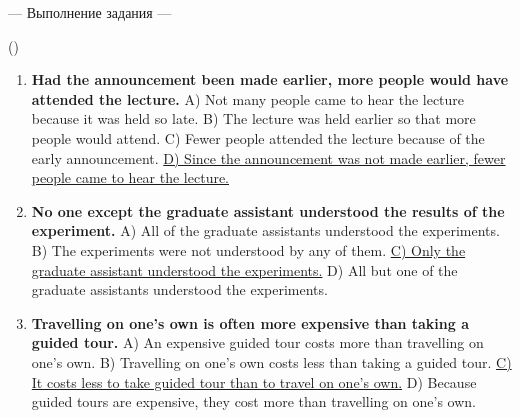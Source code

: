 \documentclass[main.tex]{subfiles}
\begin{document}


\newpage
{}

\newpage
{}

\hypertarget{ltask:2024-03-27}{--- Выполнение задания ---} (\hyperref[task:2024-03-27]{\color{blue}{перейти к тексту задания}})
\\

\vspace{5pt}
\begin{enumerate}[nosep, leftmargin=*]
	\itemsep15pt
	\item \textbf{Had the announcement been made earlier, more people would have attended the lecture.}\newline
		A) Not many people came to hear the lecture because it was held so late.\newline
		B) The lecture was held earlier so that more people would attend.\newline
		C) Fewer people attended the lecture because of the early announcement.\newline
		\uline{D) Since the announcement was not made earlier, fewer people came to hear the lecture.}
	\item \textbf{No one except the graduate assistant understood the results of the experiment.}\newline
		A) All of the graduate assistants understood the experiments.\newline
		B) The experiments were not understood by any of them.\newline
		\uline{C) Only the graduate assistant understood the experiments.}\newline
		D) All but one of the graduate assistants understood the experiments.
	\item \textbf{Travelling on one's own is often more expensive than taking a guided tour.}\newline
		A) An expensive guided tour costs more than travelling on one's own.\newline
		B) Travelling on one's own costs less than taking a guided tour.\newline
		\uline{C) It costs less to take guided tour than to travel on one's own.}\newline
		D) Because guided tours are expensive, they cost more than travelling on one's own.

\end{enumerate}
\end{document}
